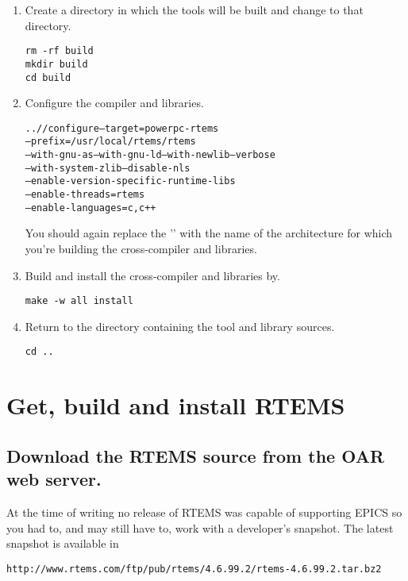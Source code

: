 \documentclass{report}
\begin{document}
\begin{enumerate}
\item Create a directory in which the tools will be built and
change to that directory.
\begin{verbatim}
rm -rf build
mkdir build
cd build
\end{verbatim}

\item Configure the compiler and libraries.
\begin{alltt}
../\GCC/configure --target=powerpc-rtems\rtemsToolVersion \verb@\@
            --prefix=/usr/local/rtems/rtems\rtemsToolVersion \verb@\@
            --with-gnu-as --with-gnu-ld --with-newlib --verbose \verb@\@
            --with-system-zlib --disable-nls \verb@\@
            --enable-version-specific-runtime-libs \verb@\@
            --enable-threads=rtems \verb@\@
            --enable-languages=c,c++ 
\end{alltt}
You should again replace the '\verb@powerpc@' with the name of the architecture
for which you're
building the cross-compiler and libraries.

\item Build and install the cross-compiler and libraries by.
\begin{verbatim}
make -w all install
\end{verbatim}

\item Return to the directory containing the tool and library sources.
\begin{verbatim}
cd ..
\end{verbatim}
\end{enumerate}



\section{Get, build and install RTEMS}
\subsection {Download the RTEMS source from the OAR web server.}

At the time of writing no release of RTEMS was capable of
supporting EPICS so you had to, and may still have to, work with a
developer's snapshot.
The latest snapshot is available in

\begin{verbatim}
http://www.rtems.com/ftp/pub/rtems/4.6.99.2/rtems-4.6.99.2.tar.bz2
\end{verbatim}
\end{document}
